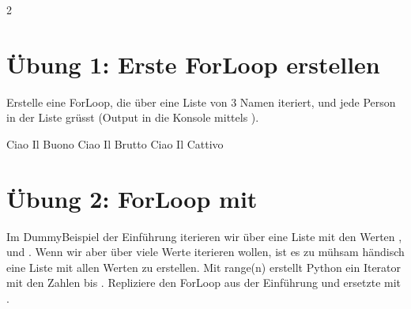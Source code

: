 \documentclass[letterpaper,10pt,english]{sphinxmanual}
\begin{document}
\begin{sphinxVerbatim}[commandchars=\\\{\}]
2
\end{sphinxVerbatim}


\section{Übung 1: Erste For\sphinxhyphen{}Loop erstellen}
\label{\detokenize{03_02_For_Loops:ubung-1-erste-for-loop-erstellen}}
Erstelle eine For\sphinxhyphen{}Loop, die über eine Liste von 3 Namen iteriert, und jede Person in der Liste grüsst (Output in die Konsole mittels ).

\begin{sphinxVerbatim}[commandchars=\\\{\}]
   \PYG{p}{[}  \PYG{p}{]}
\end{sphinxVerbatim}

\begin{sphinxVerbatim}[commandchars=\\\{\}]
Ciao  Il Buono
Ciao  Il Brutto
Ciao  Il Cattivo
\end{sphinxVerbatim}


\section{Übung 2: For\sphinxhyphen{}Loop mit }
\label{\detokenize{03_02_For_Loops:ubung-2-for-loop-mit-range}}
Im Dummy\sphinxhyphen{}Beispiel der Einführung iterieren wir über eine Liste mit den Werten ,  und . Wenn wir aber über viele Werte iterieren wollen, ist es zu mühsam händisch eine Liste mit allen Werten zu erstellen. Mit range(n) erstellt Python ein Iterator mit den Zahlen  bis . Repliziere den For\sphinxhyphen{}Loop aus der Einführung und ersetzte \sphinxcode{\sphinxupquote{{[}0,1,2{]}}} mit .
\end{document}
